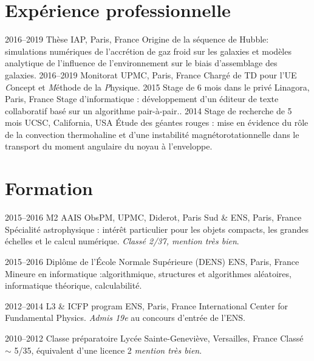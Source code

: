 \documentclass[]{friggeri-cv}
\begin{document}
\section{Expérience professionnelle}
\begin{entrylist}
\entry
{2016--2019}
{Thèse}
{IAP, Paris, France}
{Origine de la séquence de Hubble: simulations numériques de l'accrétion de gaz froid sur les galaxies et modèles analytique de l'influence de l'environnement sur le biais d'assemblage des galaxies.}
\entry
{2016--2019}
{Monitorat}
{UPMC, Paris, France}
{Chargé de TD pour l'UE \emph{C}oncept et \emph{M}éthode de la \emph{P}hysique.}
\entry
{2015}
{Stage de 6 mois dans le privé}
{Linagora, Paris, France}
{Stage d'informatique : développement d'un éditeur de texte collaboratif basé sur un algorithme pair-à-pair..}
\entry
{2014}
{Stage de recherche de 5 mois}
{UCSC, California, USA}
{Étude des géantes rouges : mise en évidence du rôle de la convection thermohaline et d'une instabilité magnétorotationnelle dans le transport du moment angulaire du noyau à l'enveloppe.}

\end{entrylist}

\section{Formation}

\begin{entrylist}
\entry
{2015--2016}
{M2 AAIS}
{ObsPM, UPMC, Diderot, Paris Sud \& ENS, Paris, France}
{Spécialité astrophysique : intérêt particulier pour les objets compacts, les grandes échelles et le calcul numérique. \emph{Classé 2/37, mention très bien}.}

\entry
{2015--2016}
{Diplôme de l'École Normale Supérieure (DENS)}
{ENS, Paris, France}
{Mineure en informatique :\@ algorithmique, structures et algorithmes aléatoires, 
informatique théorique, calculabilité.}

\entry
{2012--2014}
{L3 \& ICFP program}
{ENS, Paris, France}
{International Center for Fundamental Physics. \emph{Admis 19e} au concours d'entrée de l'ENS.}

\entry
{2010--2012}
{Classe préparatoire}
{Lycée Sainte-Geneviève, Versailles, France}
{Classé $\sim$ 5/35, équivalent d'une licence 2 \emph{mention très bien}.}

\end{entrylist}
\end{document}

